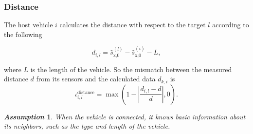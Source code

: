 \documentclass[letterpaper, 10pt, conference]{ieeeconf}  %
\newtheorem{remark}{\it Remark}%
\newtheorem{assumption}{\it Assumption}%
\begin{document}
\subsubsection{Distance}
The host vehicle $i$ calculates the distance with respect to the target $l$ according to the following 

\begin{equation*}
    d_{i,l} = \hat{s}_{\text{x,}0}^{(l)} - \hat{s}_{\text{x,}0}^{(i)} - L,
\end{equation*} 

where $L$ is the length of the vehicle. 
So the mismatch between the measured distance $d$ from its sensors and the calculated data $d_{k,i}$ is 
\begin{equation}
    \iota_{i,l}^{\text{distance}} = \max\left(1 - \left|\frac{d_{i,l} - d}{d}\right|, 0\right).
\end{equation}

\begin{assumption}
    When the vehicle is connected, it knows basic information about its neighbors, such as the type and length of the vehicle.
\end{assumption}
\end{document}
